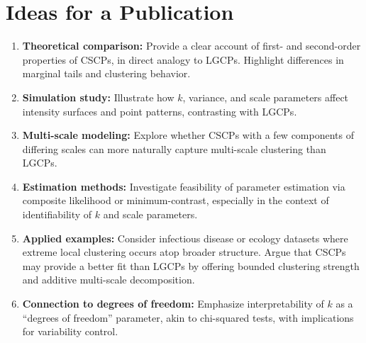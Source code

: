 \documentclass[11pt]{article}
\begin{document}
	
	\section{Ideas for a Publication}
	\begin{enumerate}
		\item \textbf{Theoretical comparison:} Provide a clear account of first- and second-order properties of CSCPs, in direct analogy to LGCPs. Highlight differences in marginal tails and clustering behavior.
		\item \textbf{Simulation study:} Illustrate how $k$, variance, and scale parameters affect intensity surfaces and point patterns, contrasting with LGCPs.
		\item \textbf{Multi-scale modeling:} Explore whether CSCPs with a few components of differing scales can more naturally capture multi-scale clustering than LGCPs.
		\item \textbf{Estimation methods:} Investigate feasibility of parameter estimation via composite likelihood or minimum-contrast, especially in the context of identifiability of $k$ and scale parameters.
		\item \textbf{Applied examples:} Consider infectious disease or ecology datasets where extreme local clustering occurs atop broader structure. Argue that CSCPs may provide a better fit than LGCPs by offering bounded clustering strength and additive multi-scale decomposition.
		\item \textbf{Connection to degrees of freedom:} Emphasize interpretability of $k$ as a ``degrees of freedom'' parameter, akin to chi-squared tests, with implications for variability control.
	\end{enumerate}
	
\end{document}

